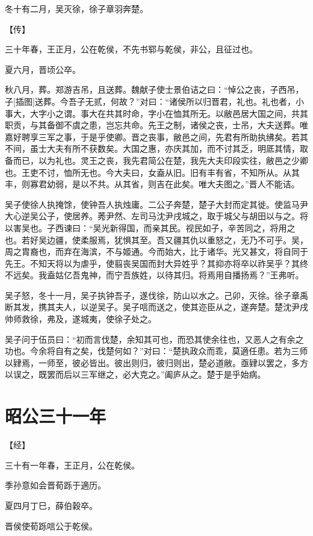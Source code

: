 \documentclass[a4paper,12pt,UTF8,twoside]{ctexbook}
\begin{document}
冬十有二月，吴灭徐，徐子章羽奔楚。

【传】

三十年春，王正月，公在乾侯，不先书郓与乾侯，非公，且征过也。

夏六月，晋顷公卒。

秋八月，葬。郑游吉吊，且送葬。魏献子使士景伯诘之曰：“悼公之丧，子西吊，子[插图]送葬。今吾子无贰，何故？”对曰：“诸侯所以归晋君，礼也。礼也者，小事大，大字小之谓。事大在共其时命，字小在恤其所无。以敝邑居大国之间，共其职贡，与其备御不虞之患，岂忘共命。先王之制，诸侯之丧，士吊，大夫送葬。唯嘉好聘享三军之事，于是乎使卿。晋之丧事，敝邑之间，先君有所助执绋矣。若其不间，虽士大夫有所不获数矣。大国之惠，亦庆其加，而不讨其乏，明厎其情，取备而已，以为礼也。灵王之丧，我先君简公在楚，我先大夫印段实往，敝邑之少卿也。王吏不讨，恤所无也。今大夫曰，女盍从旧。旧有丰有省，不知所从。从其丰，则寡君幼弱，是以不共。从其省，则吉在此矣。唯大夫图之。”晋人不能诘。

吴子使徐人执掩馀，使钟吾人执烛庸。二公子奔楚，楚子大封而定其徙。使监马尹大心逆吴公子，使居养。莠尹然、左司马沈尹戌城之，取于城父与胡田以与之。将以害吴也。子西谏曰：“吴光新得国，而亲其民。视民如子，辛苦同之，将用之也。若好吴边疆，使柔服焉，犹惧其至。吾又疆其仇以重怒之，无乃不可乎。吴，周之胄裔也，而弃在海滨，不与姬通。今而始大，比于诸华。光又甚文，将自同于先王。不知天将以为虐乎，使翦丧吴国而封大异姓乎？其抑亦将卒以祚吴乎？其终不远矣。我盍姑亿吾鬼神，而宁吾族姓，以待其归。将焉用自播扬焉？”王弗听。

吴子怒，冬十一月，吴子执钟吾子，遂伐徐，防山以水之。己卯，灭徐。徐子章禹断其发，携其夫人，以逆吴子。吴子唁而送之，使其迩臣从之，遂奔楚。楚沈尹戌帅师救徐，弗及，遂城夷，使徐子处之。

吴子问于伍员曰：“初而言伐楚，余知其可也，而恐其使余往也，又恶人之有余之功也。今余将自有之矣，伐楚何如？”对曰：“楚执政众而乖，莫適任患。若为三师以肄焉，一师至，彼必皆出。彼出则归，彼归则出，楚必道敝。亟肄以罢之，多方以误之，既罢而后以三军继之，必大克之。”阖庐从之。楚于是乎始病。


\chapter{昭公三十一年}



【经】

三十有一年春，王正月，公在乾侯。

季孙意如会晋荀跞于適历。

夏四月丁巳，薛伯穀卒。

晋侯使荀跞唁公于乾侯。
\end{document}
